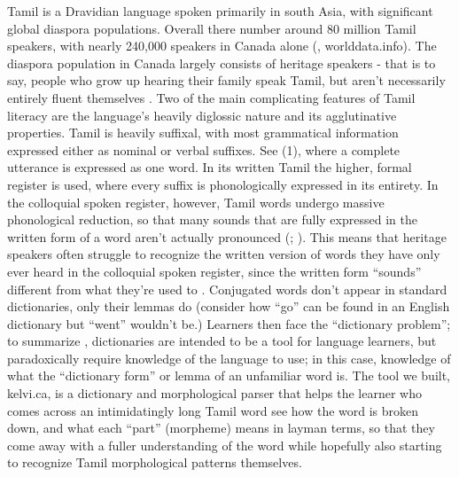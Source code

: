 \documentclass[11pt]{article}
\begin{document}
Tamil is a Dravidian language spoken primarily in south Asia, with significant global diaspora populations. 
Overall there number around 80 million Tamil speakers, with nearly 240,000 speakers in Canada alone (\citealp{government_of_canada_language_2025}, worlddata.info). 
The diaspora population in Canada largely consists of heritage speakers - that is to say, people who grow up hearing their family speak Tamil, but aren’t necessarily entirely fluent themselves \citep{polinsky_heritage_2007}. 
Two of the main complicating features of Tamil literacy are the language’s heavily diglossic nature and its agglutinative properties. 
Tamil is heavily suffixal, with most grammatical information expressed either as nominal or verbal suffixes. 
See (1), where a complete utterance is expressed as one word. 
In its written Tamil the higher, formal register is used, where every suffix is phonologically expressed in its entirety. 
In the colloquial spoken register, however, Tamil words undergo massive phonological reduction, 
so that many sounds that are fully expressed in the written form of a word aren’t actually pronounced (\citealp{annamalai_modern_2019}; \citealp{renganathan_heritage_2015}). 
This means that heritage speakers often struggle to recognize the written version of words they have only ever heard in the colloquial spoken register, 
since the written form “sounds” different from what they’re used to \citep{renganathan_heritage_2015}. 
Conjugated words don’t appear in standard dictionaries, 
only their lemmas do (consider how “go” can be found in an English dictionary but “went” wouldn’t be.) 
Learners then face the “dictionary problem”; to summarize \citet{littell_waldayu_2017}, 
dictionaries are intended to be a tool for language learners, but paradoxically require knowledge of the language to use; 
in this case, knowledge of what the “dictionary form” or lemma of an unfamiliar word is. 
The tool we built, kelvi.ca, is a dictionary and morphological parser that helps the learner who comes 
across an intimidatingly long Tamil word see how the word is broken down, and what each “part” (morpheme) means 
in layman terms, so that they come away with a fuller understanding of the word while hopefully also starting to 
recognize Tamil morphological patterns themselves.
\end{document}
